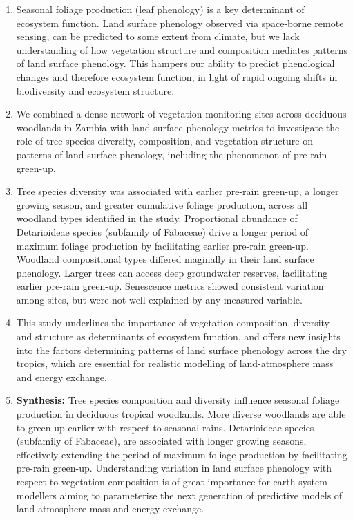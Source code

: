 \documentclass[11pt,a4paper]{article}
\providecommand{\DIFaddbegin}{} %
\providecommand{\DIFaddend}{} %
\providecommand{\DIFdelend}{} %
\newcommand{\DIFaddincludegraphics}[2][]{{\color{blue}\fbox{\DIFOincludegraphics[#1]{#2}}}} %
\DeclareRobustCommand{\DIFaddbegin}{\DIFOaddbegin \let\includegraphics\DIFaddincludegraphics} %
\DeclareRobustCommand{\DIFaddend}{\DIFOaddend \let\includegraphics\DIFOincludegraphics} %
\DeclareRobustCommand{\DIFdelend}{\DIFOaddend \let\includegraphics\DIFOincludegraphics} %
\begin{document}
\begin{enumerate}
\DIFdelend \DIFaddbegin \item{Seasonal foliage production (leaf phenology) is a key determinant of
		ecosystem function. Land surface phenology observed via space-borne
		remote sensing, can be predicted to some extent from climate, but we lack
		understanding of how vegetation structure and composition mediates patterns of
		land surface phenology. This hampers our ability to predict phenological
		changes and therefore ecosystem function, in light of rapid ongoing shifts in
		biodiversity and ecosystem structure.}

	\item{We combined a dense network of \nSites{} vegetation monitoring sites
		across deciduous woodlands in Zambia with land surface phenology
		metrics to investigate the role of tree species diversity, composition, and
		vegetation structure on patterns of land surface phenology, including the
		phenomenon of pre-rain green-up.} 

	\item{Tree species diversity was associated with earlier pre-rain green-up,
		a longer growing season, and greater cumulative foliage production,
		across all woodland types identified in the study. Proportional abundance
		of Detarioideae species (subfamily of Fabaceae) drive a longer period of
		maximum foliage production by facilitating earlier pre-rain green-up. Woodland
		compositional types differed maginally in their land surface phenology. Larger
		trees can access deep groundwater reserves, facilitating earlier pre-rain
		green-up. Senescence metrics showed consistent variation among sites, but were
		not well explained by any measured variable.}

	\item{This study underlines the importance of vegetation composition,
		diversity and structure as determinants of ecosystem function, and
		offers new insights into the factors determining patterns of land surface
		phenology across the dry tropics, which are essential for realistic modelling
		of land-atmosphere mass and energy exchange.}

	\item{\textbf{Synthesis:} Tree species composition and diversity influence
		seasonal foliage production in deciduous tropical woodlands. More
		diverse woodlands are able to green-up earlier with respect to seasonal
		rains. Detarioideae species (subfamily of Fabaceae), are associated with longer
		growing seasons, effectively extending the period of maximum foliage production
		by facilitating pre-rain green-up. Understanding variation in land surface
		phenology with respect to vegetation composition is of great importance for
		earth-system modellers aiming to parameterise the next generation of predictive
		models of land-atmosphere mass and energy exchange.}
\DIFaddend \end{enumerate}
\end{document}
